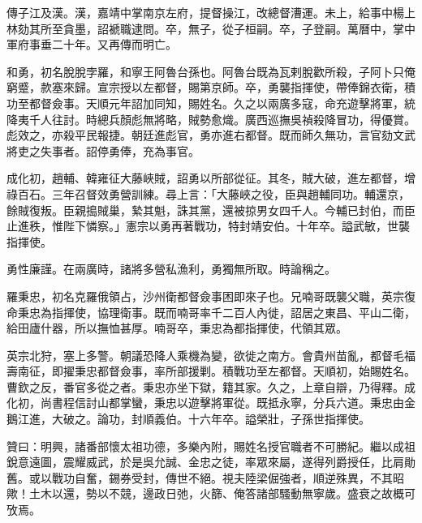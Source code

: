 \begin{pinyinscope}
傳子江及漢。漢，嘉靖中掌南京左府，提督操江，改總督漕運。未上，給事中楊上林劾其所至貪墨，詔褫職逮問。卒，無子，從子桓嗣。卒，子登嗣。萬曆中，掌中軍府事垂二十年。又再傳而明亡。

和勇，初名脫脫孛羅，和寧王阿魯台孫也。阿魯台既為瓦剌脫歡所殺，子阿卜只俺窮蹙，款塞來歸。宣宗授以左都督，賜第京師。卒，勇襲指揮使，帶俸錦衣衛，積功至都督僉事。天順元年詔加同知，賜姓名。久之以兩廣多寇，命充遊擊將軍，統降夷千人往討。時總兵顏彪無將略，賊勢愈熾。廣西巡撫吳禎殺降冒功，得優賞。彪效之，亦殺平民報捷。朝廷進彪官，勇亦進右都督。既而師久無功，言官劾文武將吏之失事者。詔停勇俸，充為事官。

成化初，趙輔、韓雍征大藤峽賊，詔勇以所部從征。其冬，賊大破，進左都督，增祿百石。三年召督效勇營訓練。尋上言：「大藤峽之役，臣與趙輔同功。輔還京，餘賊復叛。臣親搗賊巢，縶其魁，誅其黨，還被掠男女四千人。今輔已封伯，而臣止進秩，惟陛下憐察。」憲宗以勇再著戰功，特封靖安伯。十年卒。謚武敏，世襲指揮使。

勇性廉謹。在兩廣時，諸將多營私漁利，勇獨無所取。時論稱之。

羅秉忠，初名克羅俄領占，沙州衛都督僉事困即來子也。兄喃哥既襲父職，英宗復命秉忠為指揮使，協理衛事。既而喃哥率千二百人內徙，詔居之東昌、平山二衛，給田廬什器，所以撫恤甚厚。喃哥卒，秉忠為都指揮使，代領其眾。

英宗北狩，塞上多警。朝議恐降人乘機為變，欲徙之南方。會貴州苗亂，都督毛福壽南征，即擢秉忠都督僉事，率所部援剿。積戰功至左都督。天順初，始賜姓名。曹欽之反，番官多從之者。秉忠亦坐下獄，籍其家。久之，上章自辯，乃得釋。成化初，尚書程信討山都掌蠻，秉忠以遊擊將軍從。既抵永寧，分兵六道。秉忠由金鵝江進，大破之。論功，封順義伯。十六年卒。謚榮壯，子孫世指揮使。

贊曰：明興，諸番部懷太祖功德，多樂內附，賜姓名授官職者不可勝紀。繼以成祖銳意遠圖，震耀威武，於是吳允誠、金忠之徒，率眾來屬，遂得列爵授任，比肩勛舊。或以戰功自奮，錫券受封，傳世不絕。視夫陸梁倔強者，順逆殊異，不其昭歟！土木以還，勢以不競，邊政日弛，火篩、俺答諸部騷動無寧歲。盛衰之故概可攷焉。


\end{pinyinscope}